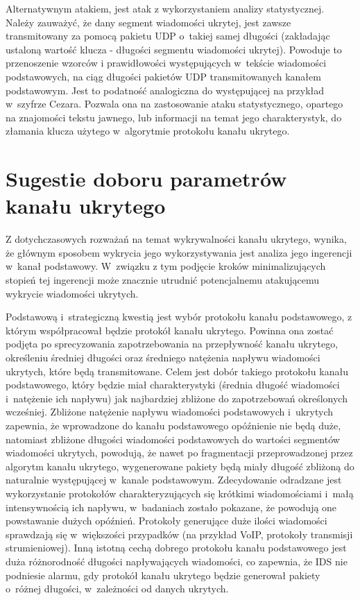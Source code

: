 \documentclass[a4paper, twoside, 12pt]{report}
\begin{document}
       Alternatywnym atakiem, jest atak z wykorzystaniem analizy statystycznej.
       Należy zauważyć, że dany segment wiadomości ukrytej, jest zawsze transmitowany
       za pomocą pakietu UDP o~takiej samej długości (zakładając ustaloną wartość klucza -
       długości segmentu wiadomości ukrytej). Powoduje to przenoszenie wzorców i
       prawidłowości występujących w~tekście wiadomości podstawowych, na ciąg długości
       pakietów UDP transmitowanych kanałem podstawowym. Jest to podatność analogiczna
       do występującej na przykład w~szyfrze Cezara. Pozwala ona na zastosowanie
       ataku statystycznego, opartego na znajomości tekstu jawnego, lub informacji
       na temat jego charakterystyk, do złamania klucza użytego w~algorytmie protokołu
       kanału ukrytego.

    \section{Sugestie doboru parametrów kanału ukrytego} \label{SUGESTIEPARAMETROW}
       Z dotychczasowych rozważań na temat wykrywalności kanału ukrytego, wynika,
       że głównym sposobem wykrycia jego wykorzystywania jest analiza jego ingerencji
       w~kanał podstawowy. W~związku z tym podjęcie kroków minimalizujących stopień
       tej ingerencji może znacznie utrudnić potencjalnemu atakującemu wykrycie
       wiadomości ukrytych.

       Podstawową i~strategiczną kwestią jest wybór protokołu kanału podstawowego,
       z którym współpracował będzie protokół kanału ukrytego. Powinna ona zostać
       podjęta po sprecyzowania zapotrzebowania na przepływność kanału ukrytego,
       określeniu średniej długości oraz średniego natężenia napływu wiadomości
       ukrytych, które będą transmitowane. Celem jest dobór takiego protokołu
       kanału podstawowego, który będzie miał charakterystyki (średnia długość wiadomości
       i~natężenie ich napływu) jak najbardziej zbliżone do zapotrzebowań określonych
       wcześniej. Zbliżone natężenie napływu wiadomości podstawowych i~ukrytych zapewnia,
       że wprowadzone do kanału podstawowego opóźnienie nie będą duże, natomiast
       zbliżone długości wiadomości podstawowych do wartości segmentów wiadomości ukrytych,
       powodują, że nawet po fragmentacji przeprowadzonej przez algorytm kanału ukrytego,
       wygenerowane pakiety będą miały długość zbliżoną do naturalnie występującej
       w~kanale podstawowym. Zdecydowanie odradzane jest wykorzystanie protokołów
       charakteryzujących się krótkimi wiadomościami i~małą intensywnością ich napływu,
       w~badaniach zostało pokazane, że powodują one powstawanie dużych opóźnień.
       Protokoły generujące duże ilości wiadomości sprawdzają się w~większości
       przypadków (na przykład VoIP, protokoły transmisji strumieniowej).
       Inną istotną cechą dobrego protokołu kanału podstawowego jest duża różnorodność
       długości napływających wiadomości, co zapewnia, że IDS nie podniesie alarmu,
       gdy protokół kanału ukrytego będzie generował pakiety o~różnej długości,
       w~zależności od danych ukrytych.
\end{document}
